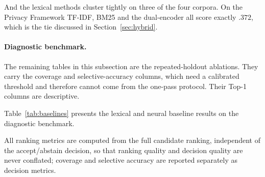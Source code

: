 \documentclass[a4paper,fleqn]{cas-sc}
\begin{document}
And the lexical methods cluster tightly on three of the four corpora. On the Privacy Framework TF-IDF, BM25 and the dual-encoder all score exactly $.372$, which is the tie discussed in Section~\ref{sec:hybrid}.

\paragraph{Diagnostic benchmark.}
\label{sec:results-synth}
The remaining tables in this subsection are the repeated-holdout ablations. They carry the coverage and selective-accuracy columns, which need a calibrated threshold and therefore cannot come from the one-pass protocol. Their Top-1 columns are descriptive.

Table~\ref{tab:baselines} presents the lexical and neural baseline results on the diagnostic benchmark.

\begin{table}[htbp]
\caption{Baseline comparison on the diagnostic benchmark. Repeated-holdout protocol, mean $\pm$ 95\% CI over 30 seeds, 110 controls, 86 positive links. Descriptive; the cross-corpus ranking claims of Section~\ref{sec:results-multi} use the one-pass protocol instead.}
\label{tab:baselines}
\centering
\setlength{\tabcolsep}{3pt}
\small
{}
\end{table}

All ranking metrics are computed from the full candidate ranking, independent of the accept/abstain decision, so that ranking quality and decision quality are never conflated; coverage and selective accuracy are reported separately as decision metrics.
\end{document}
